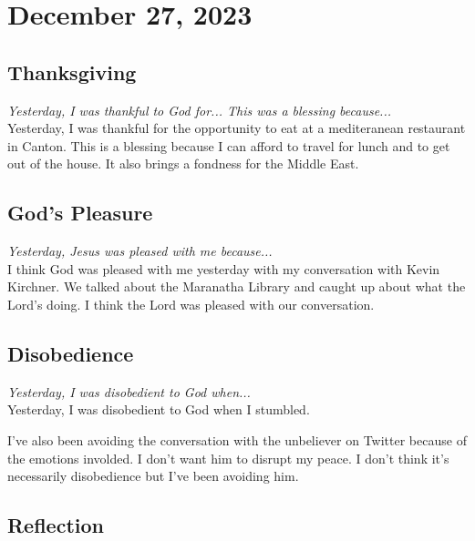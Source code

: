
\section*{December 27, 2023}


\subsection*{Thanksgiving}
\textit{Yesterday, I was thankful to God for... This was a blessing because...} \\

\noindent Yesterday, I was thankful for the opportunity to eat at a mediteranean restaurant in Canton. This is a blessing because I can afford to travel for lunch and to get out of the house. It also brings a fondness for the Middle East.

\subsection*{God's Pleasure}
\textit{Yesterday, Jesus was pleased with me because...} \\

\noindent I think God was pleased with me yesterday with my conversation with Kevin Kirchner. We talked about the Maranatha Library and caught up about what the Lord's doing. I think the Lord was pleased with our conversation.

\subsection*{Disobedience}

\textit{Yesterday, I was disobedient to God when...} \\

\noindent Yesterday, I was disobedient to God when I stumbled.

I've also been avoiding the conversation with the unbeliever on Twitter because of the emotions involded. I don't want him to disrupt my peace. I don't think it's necessarily disobedience but I've been avoiding him. \\

\subsection*{Reflection}

